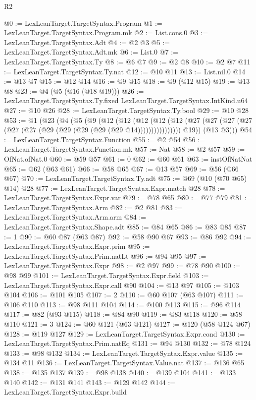 \begin{lexlean}{R2}
\begin{coremodule}
@0 := LexLeanTarget.TargetSyntax.Program
@1 := LexLeanTarget.TargetSyntax.Program.mk
@2 := List.cons.{0}
@3 := LexLeanTarget.TargetSyntax.Adt
@4 := @2 @3
@5 := LexLeanTarget.TargetSyntax.Adt.mk
@6 := List.{0}
@7 := LexLeanTarget.TargetSyntax.Ty
@8 := @6 @7
@9 := @2 @8
@10 := @2 @7
@11 := LexLeanTarget.TargetSyntax.Ty.nat
@12 := @10 @11
@13 := List.nil.{0}
@14 := @13 @7
@15 := @12 @14
@16 := @9 @15
@18 := @9 (@12 @15)
@19 := @13 @8
@23 := @4 (@5 (@16 (@18 @19)))
@26 := LexLeanTarget.TargetSyntax.Ty.fixed LexLeanTarget.TargetSyntax.IntKind.u64
@27 := @10 @26
@28 := LexLeanTarget.TargetSyntax.Ty.bool
@29 := @10 @28
@53 := @1
    (@23
      (@4
        (@5
          (@9
            (@12
              (@12
                (@12
                  (@12
                    (@12 (@27 (@27 (@27 (@27 (@27 (@27 (@29 (@29 (@29 (@29 (@29 @14))))))))))))))))
            @19))
        (@13 @3)))
@54 := LexLeanTarget.TargetSyntax.Function
@55 := @2 @54
@56 := LexLeanTarget.TargetSyntax.Function.mk
@57 := Nat
@58 := @2 @57
@59 := OfNat.ofNat.{0}
@60 := @59 @57
@61 := 0
@62 := @60 @61
@63 := instOfNatNat
@65 := @62 (@63 @61)
@66 := @58 @65
@67 := @13 @57
@69 := @56 (@66 @67)
@70 := LexLeanTarget.TargetSyntax.Ty.adt
@75 := @69 (@10 (@70 @65) @14) @28
@77 := LexLeanTarget.TargetSyntax.Expr.match @28
@78 := LexLeanTarget.TargetSyntax.Expr.var
@79 := @78 @65
@80 := @77 @79
@81 := LexLeanTarget.TargetSyntax.Arm
@82 := @2 @81
@83 := LexLeanTarget.TargetSyntax.Arm.arm
@84 := LexLeanTarget.TargetSyntax.Shape.adt
@85 := @84 @65
@86 := @83 @85
@87 := 1
@90 := @60 @87 (@63 @87)
@92 := @58 @90 @67
@93 := @86 @92
@94 := LexLeanTarget.TargetSyntax.Expr.prim
@95 := LexLeanTarget.TargetSyntax.Prim.natLt
@96 := @94 @95
@97 := LexLeanTarget.TargetSyntax.Expr
@98 := @2 @97
@99 := @78 @90
@100 := @98 @99
@101 := LexLeanTarget.TargetSyntax.Expr.field
@103 := LexLeanTarget.TargetSyntax.Expr.call @90
@104 := @13 @97
@105 := @103 @104
@106 := @101 @105
@107 := 2
@110 := @60 @107 (@63 @107)
@111 := @106 @110
@113 := @98 @111 @104
@114 := @100 @113
@115 := @96 @114
@117 := @82 (@93 @115)
@118 := @84 @90
@119 := @83 @118
@120 := @58 @110
@121 := 3
@124 := @60 @121 (@63 @121)
@127 := @120 (@58 @124 @67)
@128 := @119 @127
@129 := LexLeanTarget.TargetSyntax.Expr.cond
@130 := LexLeanTarget.TargetSyntax.Prim.natEq
@131 := @94 @130
@132 := @78 @124
@133 := @98 @132
@134 := LexLeanTarget.TargetSyntax.Expr.value
@135 := @134 @11
@136 := LexLeanTarget.TargetSyntax.Value.nat
@137 := @136 @65
@138 := @135 @137
@139 := @98 @138
@140 := @139 @104
@141 := @133 @140
@142 := @131 @141
@143 := @129 @142
@144 := LexLeanTarget.TargetSyntax.Expr.build

\end{coremodule}
\end{lexlean}
